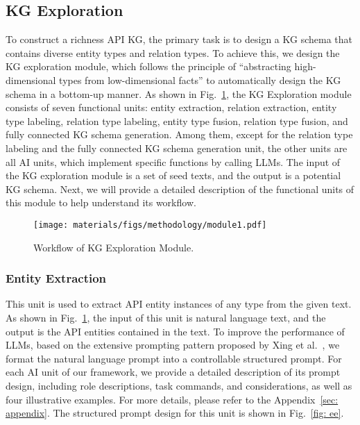 \subsection{KG Exploration}
To construct a richness API KG, the primary task is to design a KG schema that contains diverse entity types and relation types.
To achieve this, we design the KG exploration module, which follows the principle of ``abstracting high-dimensional types from low-dimensional facts'' to automatically design the KG schema in a bottom-up manner.
As shown in Fig.~\ref{fig: module1}, the KG Exploration module consists of seven functional units: entity extraction, relation extraction, entity type labeling, relation type labeling, entity type fusion, relation type fusion, and fully connected KG schema generation.
Among them, except for the relation type labeling and the fully connected KG schema generation unit, the other units are all AI units, which implement specific functions by calling LLMs.  
The input of the KG exploration module is a set of seed texts, and the output is a potential KG schema.
Next, we will provide a detailed description of the functional units of this module to help understand its workflow.


\begin{figure}[t]
    \centering
    \texttt{[image: materials/figs/methodology/module1.pdf]}
    \caption{Workflow of KG Exploration Module.}
    \label{fig: module1}
\end{figure}

\subsubsection{Entity Extraction}
This unit is used to extract API entity instances of any type from the given text.
As shown in Fig.~\ref{fig: module1}, the input of this unit is natural language text, and the output is the API entities contained in the text.
To improve the performance of LLMs, based on the extensive prompting pattern proposed by Xing et al.~\cite{xing2025when}, we format the natural language prompt into a controllable structured prompt. 
For each AI unit of our framework, we provide a detailed description of its prompt design, including role descriptions, task commands, and considerations, as well as four illustrative examples.
For more details, please refer to the Appendix~\ref{sec: appendix}.
The structured prompt design for this unit is shown in Fig.~\ref{fig: ee}.

